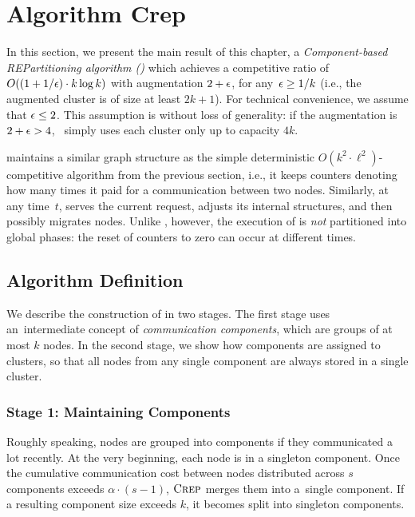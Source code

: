
\section{Algorithm {\sc Crep}}
\label{sec:crep}

In this section, we present the main result of this chapter, a
\emph{Component-based REPartitioning algorithm (\CREP)} which achieves a
competitive ratio of $O((1 + 1/\epsilon) \cdot k \log k)$ with augmentation
$2+\epsilon$, for any~$\epsilon \geq 1/k$ (i.e., the augmented cluster
is of size at least $2k+1$). For technical convenience, we assume that 
$\epsilon \leq 2$. This assumption is without loss of generality: if the augmentation 
is $2+\epsilon > 4$, \CREP~simply uses each cluster only up to capacity $4k$.

\CREP maintains a similar graph structure as the
simple deterministic $O(k^2 \cdot \ell^2)$-competitive algorithm \DET from the
previous section, i.e., it keeps counters denoting how many times it paid for a
communication between two nodes. Similarly, at any time~$t$,
\CREP serves the current request, adjusts its internal structures, and then
possibly migrates nodes. Unlike \DET, however, the execution of \CREP is
\emph{not} partitioned into global phases: the reset of counters to zero can
occur at different times.


\subsection{Algorithm Definition}

We describe the construction of \CREP in two stages. The first stage uses
an~intermediate concept of \emph{communication components}, which are groups of at
most $k$ nodes. In the second stage, we show how components are assigned to
clusters, so that all nodes from any single component are always stored in a
single cluster.


\subsubsection{Stage 1: Maintaining Components}

Roughly speaking, nodes are grouped into components if they communicated a lot
recently. At the very beginning, each node is in a singleton component. Once
the cumulative communication cost between nodes distributed across $s$
components exceeds $\alpha \cdot (s-1)$, $\textsc{Crep}$ merges them into a~single
component. If a resulting component size exceeds $k$, it becomes split
into singleton components.

